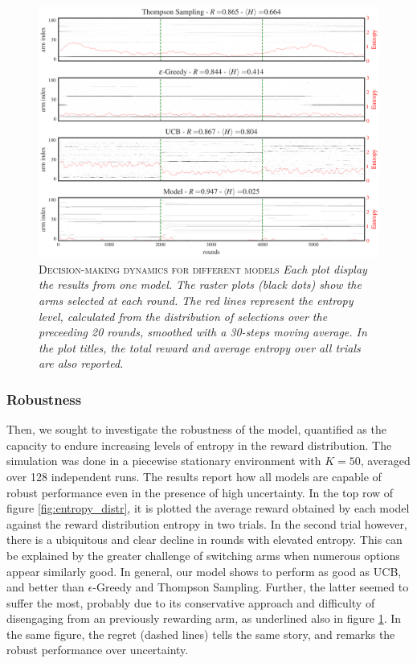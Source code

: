 \begin{figure}[H]
    \centering
    \includegraphics[width=1.0\textwidth]{figures/performance_analysis_v0_1.png}
    \caption{\textsc{Decision-making dynamics for different models} \textit{Each plot display the results from one model. The raster plots (black dots) show the arms selected at each round.
The red lines represent the entropy level, calculated from the distribution of selections over the preceeding 20 rounds, smoothed with a 30-steps moving average. In the plot titles, the total reward and average entropy over all trials are also reported.}}
    \label{fig:entropy_fig1}
\end{figure}


\subsubsection{Robustness}

\noindent Then, we sought to investigate the robustness of the model, quantified as the capacity to endure increasing levels of entropy in the reward distribution.
The simulation was done in a piecewise stationary environment with $K=50$, averaged over 128 independent runs.
The results report how all models are capable of robust performance even in the presence of high uncertainty.
In the top row of figure \ref{fig:entropy_distr}, it is plotted the average reward obtained by each model against the reward distribution entropy in two trials.
In the second trial however, there is a ubiquitous and clear decline in rounds with elevated entropy. This can be explained by the greater challenge of switching arms when numerous options appear similarly good.
In general, our model shows to perform as good as UCB, and better than $\epsilon$-Greedy and Thompson Sampling.
Further, the latter seemed to suffer the most, probably due to its conservative approach and difficulty of disengaging from an previously rewarding arm, as underlined also in figure \ref{fig:entropy_fig1}.
In the same figure, the regret (dashed lines) tells the same story, and remarks the robust performance over uncertainty.

